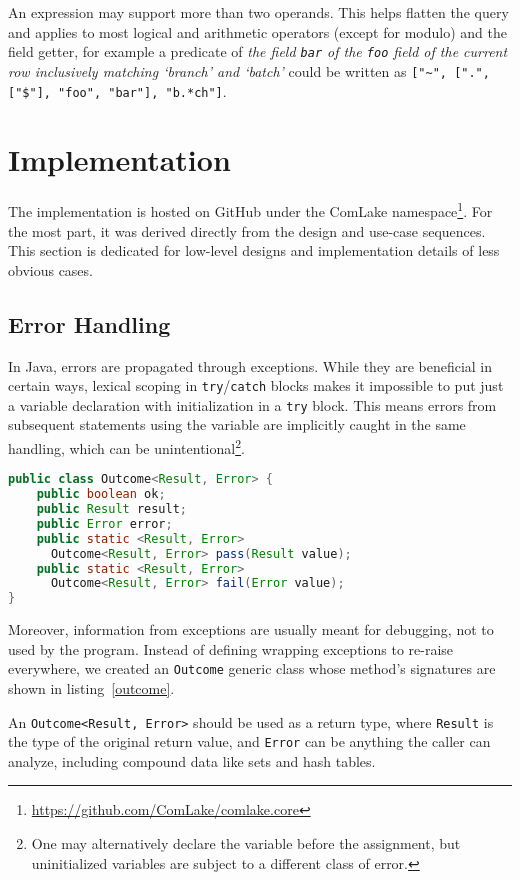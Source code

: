 An expression may support more than two operands.  This helps flatten the query
and applies to most logical and arithmetic operators (except for modulo)
and the field getter, for example a predicate of \emph{the field \texttt{bar}
of the \texttt{foo} field of the current row inclusively matching `branch' and
`batch'} could be written as \verb|["~", [".", ["$"], "foo", "bar"], "b.*ch"]|.

\section{Implementation}
The implementation is hosted on GitHub under the ComLake
namespace\footnote{\url{https://github.com/ComLake/comlake.core}}.
For the most part, it was derived directly from the design
and use-case sequences.  This section is dedicated for low-level designs
and implementation details of less obvious cases.

\subsection{Error Handling}
In Java, errors are propagated through exceptions.  While they are beneficial
in certain ways, lexical scoping in \verb|try|/\verb|catch| blocks makes it
impossible to put just a variable declaration with initialization in
a \verb|try| block.  This means errors from subsequent statements using
the variable are implicitly caught in the same handling, which can
be unintentional\footnote{One may alternatively declare the variable before
the assignment, but uninitialized variables are subject to a different
class of error.}.

\begin{lstlisting}[label=outcome,caption=Generic outcome type
  for replacing exceptions,language=java]
public class Outcome<Result, Error> {
    public boolean ok;
    public Result result;
    public Error error;
    public static <Result, Error>
      Outcome<Result, Error> pass(Result value);
    public static <Result, Error>
      Outcome<Result, Error> fail(Error value);
}
\end{lstlisting}

Moreover, information from exceptions are usually meant for debugging,
not to used by the program.  Instead of defining wrapping exceptions
to re-raise everywhere, we created an \verb|Outcome| generic class
whose method's signatures are shown in listing~\ref{outcome}.

An \verb|Outcome<Result, Error>| should be used as a return type,
where \verb|Result| is the type of the original return value, and \verb|Error|
can be anything the caller can analyze, including compound data like sets
and hash tables.

